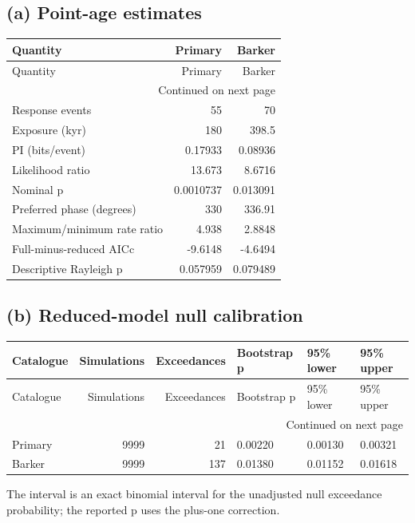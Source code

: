 \subsection*{(a) Point-age estimates}
{\small
\begin{longtable}{lrr}
\toprule
Quantity & Primary & Barker \\
\midrule
\endfirsthead
\toprule
Quantity & Primary & Barker \\
\midrule
\endhead
\midrule
\multicolumn{3}{r}{Continued on next page} \\
\midrule
\endfoot
\bottomrule
\endlastfoot
Response events & 55 & 70 \\
Exposure (kyr) & 180 & 398.5 \\
PI (bits/event) & 0.17933 & 0.08936 \\
Likelihood ratio & 13.673 & 8.6716 \\
Nominal p & 0.0010737 & 0.013091 \\
Preferred phase (degrees) & 330 & 336.91 \\
Maximum/minimum rate ratio & 4.938 & 2.8848 \\
Full-minus-reduced AICc & -9.6148 & -4.6494 \\
Descriptive Rayleigh p & 0.057959 & 0.079489 \\
\end{longtable}
}
\subsection*{(b) Reduced-model null calibration}
{\small
\begin{longtable}{lrrlll}
\toprule
Catalogue & Simulations & Exceedances & Bootstrap p & 95\% lower & 95\% upper \\
\midrule
\endfirsthead
\toprule
Catalogue & Simulations & Exceedances & Bootstrap p & 95\% lower & 95\% upper \\
\midrule
\endhead
\midrule
\multicolumn{6}{r}{Continued on next page} \\
\midrule
\endfoot
\bottomrule
\endlastfoot
Primary & 9999 & 21 & 0.00220 & 0.00130 & 0.00321 \\
Barker & 9999 & 137 & 0.01380 & 0.01152 & 0.01618 \\
\end{longtable}
}
The interval is an exact binomial interval for the unadjusted null exceedance probability; the reported p uses the plus-one correction.
